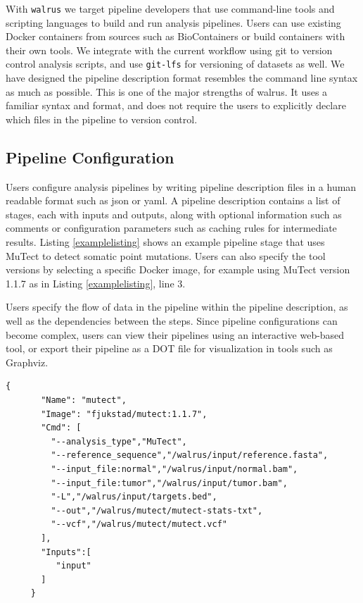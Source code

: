 With \texttt{walrus} we target pipeline developers that use command-line tools
and scripting languages to build and run analysis pipelines. Users can use
existing Docker containers from sources such as
BioContainers\cite{biocontainers} or build containers with their own tools.  We
integrate with the current workflow using git to version control analysis
scripts, and use \texttt{git-lfs} for versioning of datasets as well. We have
designed the pipeline description format resembles the command line syntax as
much as possible. This is one of the major strengths of walrus. It uses a
familiar syntax and format, and does not require the users to explicitly
declare which files in the pipeline to version control. 


\subsection{Pipeline Configuration}
Users configure analysis pipelines by writing pipeline description files in a
human readable format such as \gls{json} or \gls{yaml}. A pipeline description
contains a list of stages, each with inputs and outputs, along with optional
information such as comments or configuration parameters such as caching rules
for intermediate results. Listing \ref{examplelisting} shows an example pipeline
stage that uses MuTect\cite{mutect} to detect somatic point mutations. Users
can also specify the tool versions by selecting a specific Docker image, for
example using MuTect version 1.1.7 as in Listing \ref{examplelisting}, line 3. 

Users specify the flow of data in the pipeline within the pipeline description,
as well as the dependencies between the steps. Since pipeline configurations can
become complex, users can view their pipelines using an interactive web-based
tool, or export their pipeline as a DOT file for visualization in tools such as
Graphviz.\cite{ellson2001graphviz}

\begin{lstlisting}[caption={Example pipeline stage for a tool that detects
somatic point mutations. It reads a reference sequence file together with both
tumor and normal sequences, and produces an output file with the detected
mutations.},
label={examplelisting}, 
basicstyle=\ttfamily\scriptsize]
     {
       "Name": "mutect",
       "Image": "fjukstad/mutect:1.1.7",
       "Cmd": [
         "--analysis_type","MuTect",
         "--reference_sequence","/walrus/input/reference.fasta",
         "--input_file:normal","/walrus/input/normal.bam",
         "--input_file:tumor","/walrus/input/tumor.bam",
         "-L","/walrus/input/targets.bed",
         "--out","/walrus/mutect/mutect-stats-txt",
         "--vcf","/walrus/mutect/mutect.vcf"
       ],
       "Inputs":[
          "input" 
       ]
     }
\end{lstlisting}

